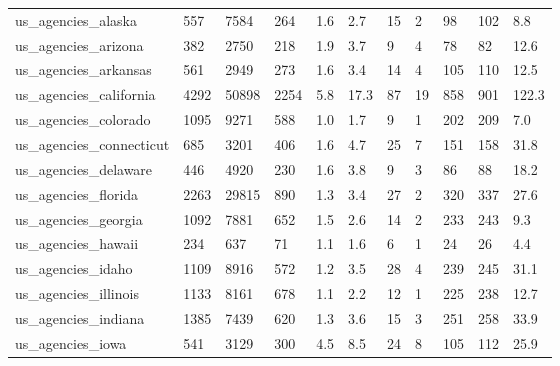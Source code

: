 \begin{longtable}{lllllllllll}
 us\_agencies\_alaska                                 & 557        & 7584      & 264   & 1.6    & 2.7    & 15    & 2      & 98     & 102    & 8.8     \\
 us\_agencies\_arizona                                & 382        & 2750      & 218   & 1.9    & 3.7    & 9     & 4      & 78     & 82     & 12.6    \\
 us\_agencies\_arkansas                               & 561        & 2949      & 273   & 1.6    & 3.4    & 14    & 4      & 105    & 110    & 12.5    \\
 us\_agencies\_california                             & 4292       & 50898     & 2254  & 5.8    & 17.3   & 87    & 19     & 858    & 901    & 122.3   \\
 us\_agencies\_colorado                               & 1095       & 9271      & 588   & 1.0    & 1.7    & 9     & 1      & 202    & 209    & 7.0     \\
 us\_agencies\_connecticut                            & 685        & 3201      & 406   & 1.6    & 4.7    & 25    & 7      & 151    & 158    & 31.8    \\
 us\_agencies\_delaware                               & 446        & 4920      & 230   & 1.6    & 3.8    & 9     & 3      & 86     & 88     & 18.2    \\
 us\_agencies\_florida                                & 2263       & 29815     & 890   & 1.3    & 3.4    & 27    & 2      & 320    & 337    & 27.6    \\
 us\_agencies\_georgia                                & 1092       & 7881      & 652   & 1.5    & 2.6    & 14    & 2      & 233    & 243    & 9.3     \\
 us\_agencies\_hawaii                                 & 234        & 637       & 71    & 1.1    & 1.6    & 6     & 1      & 24     & 26     & 4.4     \\
 us\_agencies\_idaho                                  & 1109       & 8916      & 572   & 1.2    & 3.5    & 28    & 4      & 239    & 245    & 31.1    \\
 us\_agencies\_illinois                               & 1133       & 8161      & 678   & 1.1    & 2.2    & 12    & 1      & 225    & 238    & 12.7    \\
 us\_agencies\_indiana                                & 1385       & 7439      & 620   & 1.3    & 3.6    & 15    & 3      & 251    & 258    & 33.9    \\
 us\_agencies\_iowa                                   & 541        & 3129      & 300   & 4.5    & 8.5    & 24    & 8      & 105    & 112    & 25.9    \\

\end{longtable}
